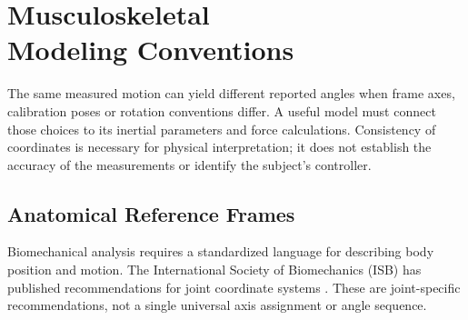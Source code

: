 \chapter[Musculoskeletal Modeling Conventions]{Musculoskeletal\\Modeling Conventions}
\label{ch:msk-conventions}

The same measured motion can yield different reported angles when frame axes,
calibration poses or rotation conventions differ. A useful model must connect
those choices to its inertial parameters and force calculations. Consistency of
coordinates is necessary for physical interpretation; it does not establish
the accuracy of the measurements or identify the subject's controller.

\section{Anatomical Reference Frames}

Biomechanical analysis requires a standardized language for describing body position and
motion. The International Society of Biomechanics (ISB) has published recommendations
for joint coordinate systems \cite{Wu2002, Wu2005}. These are joint-specific
recommendations, not a single universal axis assignment or angle sequence.

\begin{center}
\end{center}

